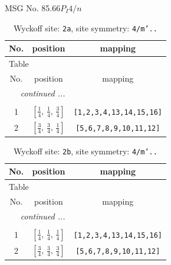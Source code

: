 \documentclass[fleqn,8pt]{jsarticle}
\begin{document}
\setcounter{MaxMatrixCols}{32}

\renewcommand{\tablename}{Table~}
\renewcommand{\figurename}{Figure~}
\begin{center}
\LARGE
MSG No. 85.66\quad$P_{I}4/n$
\end{center}
\renewcommand{\arraystretch}{1.2}
\begin{longtable}{ccc}
\caption{Wyckoff site: {\tt 2a}, site symmetry: {\tt 4/m'..}}
 \\
 \hline \hline
No. & position & mapping \\ \hline \endfirsthead

\multicolumn{2}{l}{\tablename\ \thetable{}} \\
 \hline \hline
No. & position & mapping \\ \hline \endhead

 \hline \hline
\multicolumn{2}{r}{\footnotesize\it continued ...} \\ \endfoot

 \hline \hline
\multicolumn{2}{r}{} \\ \endlastfoot

1 & $\left[ \frac{1}{4},\, \frac{1}{4},\, \frac{3}{4} \right]$ & {\tt [1,2,3,4,13,14,15,16]} \\ \hline
2 & $\left[ \frac{3}{4},\, \frac{3}{4},\, \frac{1}{4} \right]$ & {\tt [5,6,7,8,9,10,11,12]} \\
\end{longtable}
\renewcommand{\arraystretch}{1.2}
\begin{longtable}{ccc}
\caption{Wyckoff site: {\tt 2b}, site symmetry: {\tt 4/m'..}}
 \\
 \hline \hline
No. & position & mapping \\ \hline \endfirsthead

\multicolumn{2}{l}{\tablename\ \thetable{}} \\
 \hline \hline
No. & position & mapping \\ \hline \endhead

 \hline \hline
\multicolumn{2}{r}{\footnotesize\it continued ...} \\ \endfoot

 \hline \hline
\multicolumn{2}{r}{} \\ \endlastfoot

1 & $\left[ \frac{1}{4},\, \frac{1}{4},\, \frac{1}{4} \right]$ & {\tt [1,2,3,4,13,14,15,16]} \\ \hline
2 & $\left[ \frac{3}{4},\, \frac{3}{4},\, \frac{3}{4} \right]$ & {\tt [5,6,7,8,9,10,11,12]} \\
\end{longtable}
\end{document}
